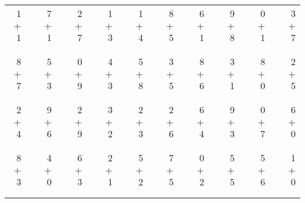 \documentclass[12pt, letterpaper]{article}
\begin{document}
\begin{tabular}{rrrrrrrrrrrrrrrrrrr}
1 & & 7 & & 2 & & 1 & & 1 & & 8 & & 6 & & 9 & & 0 & & 3\\
$+$ 1 & & $+$ 1 & & $+$ 7 & & $+$ 3 & & $+$ 4 & & $+$ 5 & & $+$ 1 & & $+$ 8 & & $+$ 1 & & $+$ 7\\
\cline{1-1} \cline{3-3} \cline{5-5} \cline{7-7} \cline{9-9} \cline{11-11} \cline{13-13} \cline{15-15} \cline{17-17} \cline{19-19} \\ \\
8 & & 5 & & 0 & & 4 & & 5 & & 3 & & 8 & & 3 & & 8 & & 2\\
$+$ 7 & & $+$ 3 & & $+$ 9 & & $+$ 3 & & $+$ 8 & & $+$ 5 & & $+$ 6 & & $+$ 1 & & $+$ 0 & & $+$ 5\\
\cline{1-1} \cline{3-3} \cline{5-5} \cline{7-7} \cline{9-9} \cline{11-11} \cline{13-13} \cline{15-15} \cline{17-17} \cline{19-19} \\ \\
2 & & 9 & & 2 & & 3 & & 2 & & 2 & & 6 & & 9 & & 0 & & 6\\
$+$ 4 & & $+$ 6 & & $+$ 9 & & $+$ 2 & & $+$ 3 & & $+$ 6 & & $+$ 4 & & $+$ 3 & & $+$ 7 & & $+$ 0\\
\cline{1-1} \cline{3-3} \cline{5-5} \cline{7-7} \cline{9-9} \cline{11-11} \cline{13-13} \cline{15-15} \cline{17-17} \cline{19-19} \\ \\
8 & & 4 & & 6 & & 2 & & 5 & & 7 & & 0 & & 5 & & 5 & & 1\\
$+$ 3 & & $+$ 0 & & $+$ 3 & & $+$ 1 & & $+$ 2 & & $+$ 5 & & $+$ 2 & & $+$ 5 & & $+$ 6 & & $+$ 0\\
\cline{1-1} \cline{3-3} \cline{5-5} \cline{7-7} \cline{9-9} \cline{11-11} \cline{13-13} \cline{15-15} \cline{17-17} \cline{19-19} \\ \\
\end{tabular}
\newpage
\end{document}
